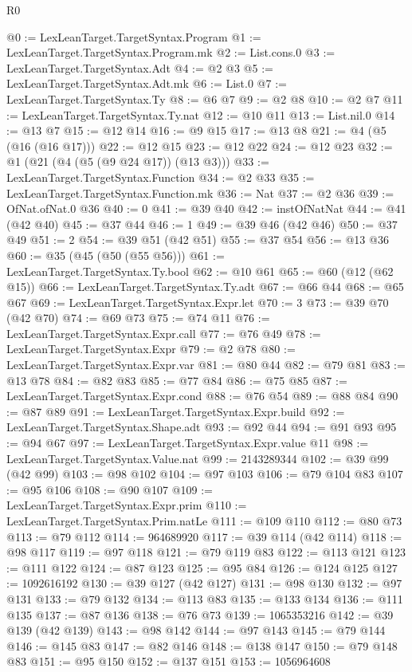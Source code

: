 \begin{lexlean}{R0}
\begin{coremodule}
@0 := LexLeanTarget.TargetSyntax.Program
@1 := LexLeanTarget.TargetSyntax.Program.mk
@2 := List.cons.{0}
@3 := LexLeanTarget.TargetSyntax.Adt
@4 := @2 @3
@5 := LexLeanTarget.TargetSyntax.Adt.mk
@6 := List.{0}
@7 := LexLeanTarget.TargetSyntax.Ty
@8 := @6 @7
@9 := @2 @8
@10 := @2 @7
@11 := LexLeanTarget.TargetSyntax.Ty.nat
@12 := @10 @11
@13 := List.nil.{0}
@14 := @13 @7
@15 := @12 @14
@16 := @9 @15
@17 := @13 @8
@21 := @4 (@5 (@16 (@16 @17)))
@22 := @12 @15
@23 := @12 @22
@24 := @12 @23
@32 := @1 (@21 (@4 (@5 (@9 @24 @17)) (@13 @3)))
@33 := LexLeanTarget.TargetSyntax.Function
@34 := @2 @33
@35 := LexLeanTarget.TargetSyntax.Function.mk
@36 := Nat
@37 := @2 @36
@39 := OfNat.ofNat.{0} @36
@40 := 0
@41 := @39 @40
@42 := instOfNatNat
@44 := @41 (@42 @40)
@45 := @37 @44
@46 := 1
@49 := @39 @46 (@42 @46)
@50 := @37 @49
@51 := 2
@54 := @39 @51 (@42 @51)
@55 := @37 @54
@56 := @13 @36
@60 := @35 (@45 (@50 (@55 @56)))
@61 := LexLeanTarget.TargetSyntax.Ty.bool
@62 := @10 @61
@65 := @60 (@12 (@62 @15))
@66 := LexLeanTarget.TargetSyntax.Ty.adt
@67 := @66 @44
@68 := @65 @67
@69 := LexLeanTarget.TargetSyntax.Expr.let
@70 := 3
@73 := @39 @70 (@42 @70)
@74 := @69 @73
@75 := @74 @11
@76 := LexLeanTarget.TargetSyntax.Expr.call
@77 := @76 @49
@78 := LexLeanTarget.TargetSyntax.Expr
@79 := @2 @78
@80 := LexLeanTarget.TargetSyntax.Expr.var
@81 := @80 @44
@82 := @79 @81
@83 := @13 @78
@84 := @82 @83
@85 := @77 @84
@86 := @75 @85
@87 := LexLeanTarget.TargetSyntax.Expr.cond
@88 := @76 @54
@89 := @88 @84
@90 := @87 @89
@91 := LexLeanTarget.TargetSyntax.Expr.build
@92 := LexLeanTarget.TargetSyntax.Shape.adt
@93 := @92 @44
@94 := @91 @93
@95 := @94 @67
@97 := LexLeanTarget.TargetSyntax.Expr.value @11
@98 := LexLeanTarget.TargetSyntax.Value.nat
@99 := 2143289344
@102 := @39 @99 (@42 @99)
@103 := @98 @102
@104 := @97 @103
@106 := @79 @104 @83
@107 := @95 @106
@108 := @90 @107
@109 := LexLeanTarget.TargetSyntax.Expr.prim
@110 := LexLeanTarget.TargetSyntax.Prim.natLe
@111 := @109 @110
@112 := @80 @73
@113 := @79 @112
@114 := 964689920
@117 := @39 @114 (@42 @114)
@118 := @98 @117
@119 := @97 @118
@121 := @79 @119 @83
@122 := @113 @121
@123 := @111 @122
@124 := @87 @123
@125 := @95 @84
@126 := @124 @125
@127 := 1092616192
@130 := @39 @127 (@42 @127)
@131 := @98 @130
@132 := @97 @131
@133 := @79 @132
@134 := @113 @83
@135 := @133 @134
@136 := @111 @135
@137 := @87 @136
@138 := @76 @73
@139 := 1065353216
@142 := @39 @139 (@42 @139)
@143 := @98 @142
@144 := @97 @143
@145 := @79 @144
@146 := @145 @83
@147 := @82 @146
@148 := @138 @147
@150 := @79 @148 @83
@151 := @95 @150
@152 := @137 @151
@153 := 1056964608

\end{coremodule}
\end{lexlean}
